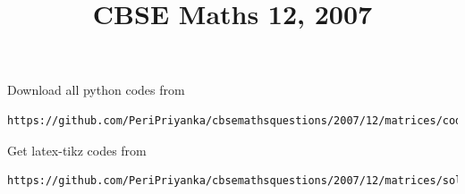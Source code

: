 \documentclass[journal,12pt,twocolumn]{IEEEtran}
\begin{document}
     \def\rightbox#1{\makebox[0in][r]{#1}}
     \def\centbox#1{\makebox[0in]{#1}}
     \def\topbox#1{\raisebox{-\baselineskip}[0in][0in]{#1}}
     \def\midbox#1{\raisebox{-0.5\baselineskip}[0in][0in]{#1}}
\vspace{3cm}
\title{CBSE Maths 12, 2007}
\maketitle
\newpage
\tableofcontents
\bigskip
\renewcommand{\thefigure}{\theenumi}
\renewcommand{\thetable}{\theenumi}
Download all python codes from 
\begin{lstlisting}
https://github.com/PeriPriyanka/cbsemathsquestions/2007/12/matrices/codes/solutions
\end{lstlisting}
%
Get latex-tikz codes from 
%
\begin{lstlisting}
https://github.com/PeriPriyanka/cbsemathsquestions/2007/12/matrices/solutions
\end{lstlisting}
\end{document}
